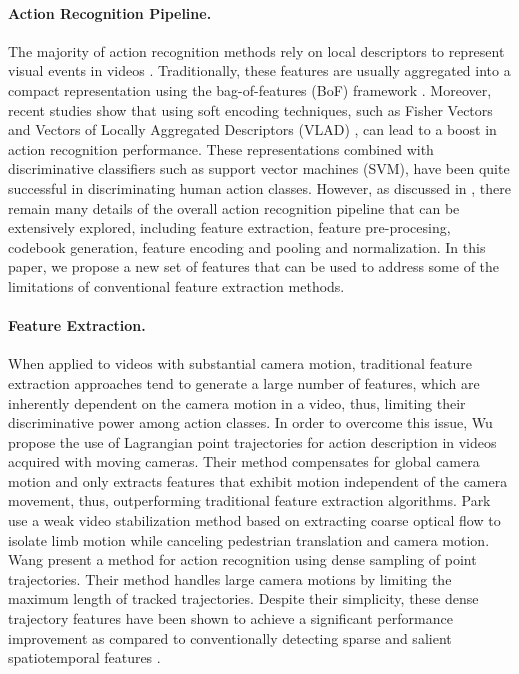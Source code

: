 \paragraph{\textbf{Action Recognition Pipeline.}}The majority of action recognition methods rely on local descriptors to represent visual events in videos \cite{laptev2005,dollar2005,wang2011}. Traditionally, these features are usually aggregated into a compact representation using the bag-of-features (BoF) framework \cite{laptev2008}. Moreover, recent studies show that using soft encoding techniques, such as  Fisher Vectors \cite{perronnin2010} and Vectors of Locally Aggregated Descriptors (VLAD) \cite{jegou2012}, can lead to a boost in action recognition performance. These representations combined with discriminative classifiers such as support vector machines (SVM), have been quite successful in discriminating human action classes. However, as discussed in \cite{xwang2013}, there remain many details of the overall action recognition pipeline that can be extensively explored, including feature extraction, feature pre-procesing, codebook generation, feature encoding and pooling and normalization. In this paper, we propose a new set of features that can be used to address some of the limitations of conventional feature extraction methods.

\paragraph{\textbf{Feature Extraction.}} When applied to videos with substantial camera motion, traditional feature extraction approaches \cite{dollar2005, laptev2005}  tend to generate a large number of features, which are inherently dependent on the camera motion in a video, thus, limiting their discriminative power among action classes. In order to overcome this issue, Wu \etal \cite{wu2011} propose the use of Lagrangian point trajectories for action description in videos acquired with moving cameras. Their method compensates for global camera motion and only extracts features that exhibit motion independent of the camera movement, thus, outperforming traditional feature extraction algorithms. Park \etal \cite{park2013} use a weak video stabilization method based on extracting coarse optical flow to isolate limb motion while canceling pedestrian translation and camera motion. Wang \etal \cite{wang2011} present a method for action recognition using dense sampling of point trajectories. Their method handles large camera motions by limiting the maximum length of tracked trajectories. Despite their simplicity, these dense trajectory features have been shown to achieve a significant performance improvement as compared to conventionally detecting sparse and salient spatiotemporal features \cite{laptev2005}.

